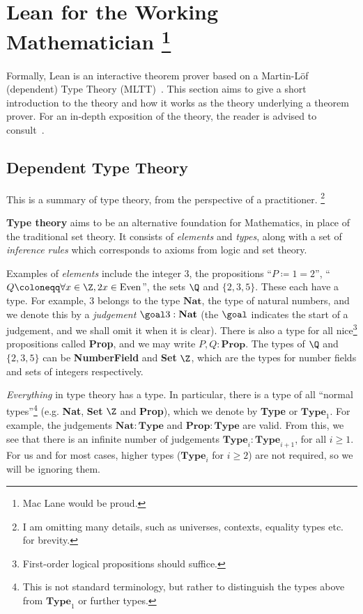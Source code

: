 \section{Lean for the Working Mathematician \protect\footnote{Mac Lane would be proud.}}

Formally, Lean is an interactive theorem prover based on a Martin-Löf (dependent) Type Theory (MLTT)~\cite{MartinLöf1984}. This section aims to give a short introduction to the theory and how it works as the theory underlying a theorem prover. For an in-depth exposition of the theory, the reader is advised to consult~\cite{Rijke2022}.

\subsection{Dependent Type Theory}

This is a summary of type theory, from the perspective of a practitioner. \footnote{I am omitting many details, such as universes, contexts, equality types etc. for brevity.}

\begin{gtheorem*}
  \textbf{Type theory} aims to be an alternative foundation for Mathematics, in place of the traditional set theory. It consists of \textit{elements} and \textit{types}, along with a set of \textit{inference rules} which corresponds to axioms from logic and set theory.
\end{gtheorem*}

Examples of \textit{elements} include the integer \(3\), the propositions ``\(P \coloneqq 1 = 2\)'', ``\(Q \coloneqq \forall x \in \Z, 2x \in \mathrm{Even}\)'', the sets \(\Q\) and \(\{2, 3, 5\}\). These each have a type. For example, \(3\) belongs to the type \(\mathbf{Nat}\), the type of natural numbers, and we denote this by a \textit{judgement} \(\goal 3 : \mathbf{Nat}\) (the \(\goal\) indicates the start of a judgement, and we shall omit it when it is clear). There is also a type for all nice\footnote{First-order logical propositions should suffice.} propositions called \textbf{Prop}, and we may write \(P, Q : \mathbf{Prop}\). The types of \(\Q\) and \(\{2, 3, 5\}\) can be \textbf{NumberField} and \textbf{Set} \(\Z\), which are the types for number fields and sets of integers respectively.

\textit{Everything} in type theory has a type. In particular, there is a type of all ``normal types''\footnote{This is not standard terminology, but rather to distinguish the types above from \(\mathbf{Type}_1\) or further types.} (e.g. \textbf{Nat}, \textbf{Set} \(\Z\) and \textbf{Prop}), which we denote by \textbf{Type} or \(\mathbf{Type}_1\). For example, the judgements \(\mathbf{Nat} : \mathbf{Type}\) and \(\mathbf{Prop} : \mathbf{Type}\) are valid. From this, we see that there is an infinite number of judgements \(\mathbf{Type}_i : \mathbf{Type}_{i + 1}\), for all \(i \geq 1\). For us and for most cases, higher types (\(\mathbf{Type}_i\) for \(i \geq 2\)) are not required, so we will be ignoring them.


